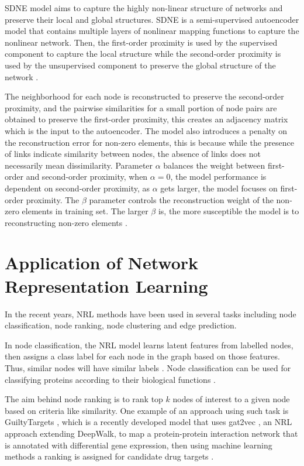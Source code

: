 \ac{SDNE} model aims to capture the highly non-linear structure of networks and preserve their local and global structures.
\ac{SDNE} is a semi-supervised autoencoder model that contains multiple layers of nonlinear mapping functions to capture the nonlinear network.
Then, the first-order proximity is used by the supervised component to capture the local structure while the second-order proximity is used by the unsupervised component to preserve the global structure of the network \cite{wang_structural_2016}.

The neighborhood for each node is reconstructed to preserve the second-order proximity, and the pairwise similarities for a small portion of node pairs are obtained to preserve the first-order proximity, this creates an adjacency matrix which is the input to the autoencoder.
The model also introduces a penalty on the reconstruction error for non-zero elements, this is because while the presence of links indicate similarity between nodes, the absence of links does not necessarily mean dissimilarity.
Parameter $\alpha$ balances the weight between first-order and second-order proximity, when $\alpha=0$, the model performance is dependent on second-order proximity, as $\alpha$ gets larger, the model focuses on first-order proximity.
The $\beta$ parameter controls the reconstruction weight of the non-zero elements in training set.
The larger $\beta$ is, the more susceptible the model is to reconstructing non-zero elements \cite{wang_structural_2016}.

\section{Application of Network Representation Learning}

In the recent years, \ac{NRL} methods have been used in several tasks including node classification, node ranking, node clustering and edge prediction.

In node classification, the \ac{NRL} model learns latent features from labelled nodes, then assigns a class label for each node in the graph based on those features.
Thus, similar nodes will have similar labels \cite{cui_survey_2017}.
Node classification can be used for classifying proteins according to their biological functions \cite{grover_node2vec:_2016}.

The aim behind node ranking is to rank top $k$ nodes of interest to a given node based on criteria like similarity.
One example of an approach using such task is GuiltyTargets \cite{muslu_guiltytargets:_2019}, which is a recently developed model that uses gat2vec \cite{sheikh_gat2vec:_2018}, an \ac{NRL} approach extending DeepWalk, to map a protein-protein interaction network that is annotated with differential gene expression, then using machine learning methods a ranking is assigned for candidate drug targets \cite{muslu_guiltytargets:_2019}.

